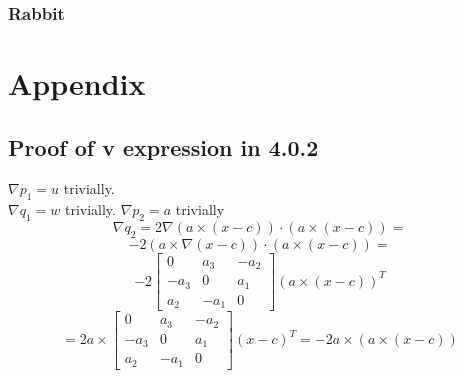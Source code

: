 \documentclass{article}
\begin{document}
\subsubsection{Rabbit}






\section{Appendix}
\subsection{Proof of v expression in 4.0.2}
$\nabla p_{1}=u$ trivially.\\
$\nabla q_{1}=w$ trivially.
$\nabla p_{2}=a$ trivially
$$\nabla q_{2}=2 \nabla (a \times (x-c))\cdot (a \times (x-c))=$$ 
$$-2(a \times \nabla (x-c))\cdot(a\times (x-c))= $$ $$-2\begin{bmatrix} 0 & a_{3} & -a_{2} \\ -a_{3} & 0 & a_{1} \\ a_{2} & -a_{1} & 0 \end{bmatrix} (a \times (x-c))^{T} $$
$$=2 a\times \begin{bmatrix} 0 & a_{3} & -a_{2} \\ -a_{3} & 0 & a_{1} \\ a_{2} & -a_{1} & 0 \end{bmatrix}(x-c)^{T}=-2 a \times (a \times (x-c) ) $$




\end{document}
